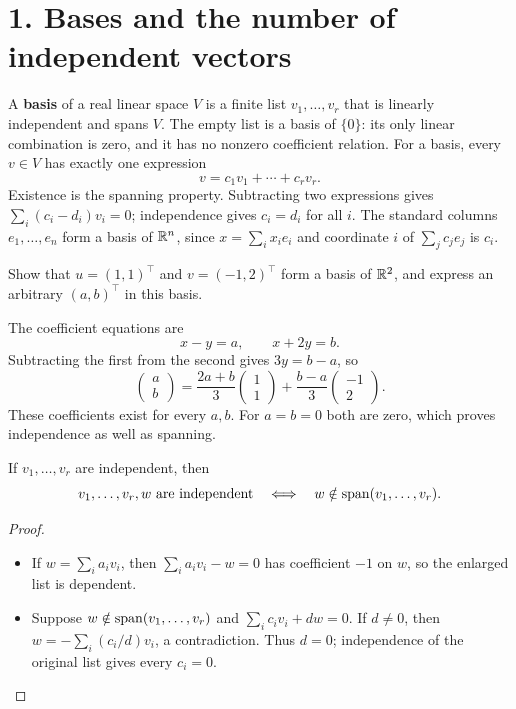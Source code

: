 \section*{1. Bases and the number of independent vectors}

A \textbf{basis} of a real linear space \(V\) is a finite list
\(v_1,\ldots,v_r\) that is linearly independent and spans \(V\).
The empty list is a basis of \(\{0\}\): its only linear combination is zero,
and it has no nonzero coefficient relation.
For a basis, every \(v\in V\) has exactly one expression
\[
v=c_1v_1+\cdots+c_rv_r.
\]
Existence is the spanning property. Subtracting two expressions gives
\(\sum_i(c_i-d_i)v_i=0\); independence gives \(c_i=d_i\) for all \(i\).
The standard columns \(e_1,\ldots,e_n\) form a basis of \(\mathbb R^n\), since
\(x=\sum_i x_ie_i\) and coordinate \(i\) of \(\sum_j c_je_j\) is \(c_i\).

\begin{example}\label{example:03:coordinates}
Show that \(u=(1,1)^\top\) and \(v=(-1,2)^\top\) form a basis of \(\mathbb R^2\),
and express an arbitrary \((a,b)^\top\) in this basis.

The coefficient equations are
\[
x-y=a,\qquad x+2y=b.
\]
Subtracting the first from the second gives \(3y=b-a\), so
\[
\boxed{\begin{pmatrix}a\\b\end{pmatrix}
=\frac{2a+b}{3}\begin{pmatrix}1\\1\end{pmatrix}
+\frac{b-a}{3}\begin{pmatrix}-1\\2\end{pmatrix}.}
\]
These coefficients exist for every \(a,b\). For \(a=b=0\) both are zero,
which proves independence as well as spanning.
\end{example}

\begin{proposition}\label{prop:03:adjoin}
If \(v_1,\ldots,v_r\) are independent, then
\[
v_1,\ldots,v_r,w\text{ are independent}
\quad\Longleftrightarrow\quad
w\notin\operatorname{span}(v_1,\ldots,v_r).
\]
\end{proposition}
\begin{proof}
\begin{itemize}
\item If \(w=\sum_i a_iv_i\), then \(\sum_i a_iv_i-w=0\) has
coefficient \(-1\) on \(w\), so the enlarged list is dependent.
\item Suppose \(w\notin\operatorname{span}(v_1,\ldots,v_r)\) and
\(\sum_i c_iv_i+dw=0\). If \(d\ne0\), then
\(w=-\sum_i(c_i/d)v_i\), a contradiction.
Thus \(d=0\); independence of the original list gives every \(c_i=0\).
\end{itemize}
\end{proof}

